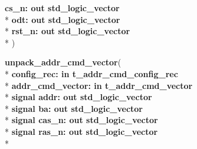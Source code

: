 \begin{DoxyCompactItemize}
  {\bfseries \textcolor{vhdlchar}{ }\textcolor{vhdlchar}{cs\+\_\+n\+: }\textcolor{stringliteral}{} {\bfseries \textcolor{keywordflow}{out}\textcolor{vhdlchar}{ }\textcolor{comment}{std\+\_\+logic\+\_\+vector}\textcolor{vhdlchar}{ }}}\\*
  {\bfseries \textcolor{vhdlchar}{ }\textcolor{vhdlchar}{odt\+: }\textcolor{stringliteral}{} {\bfseries \textcolor{keywordflow}{out}\textcolor{vhdlchar}{ }\textcolor{comment}{std\+\_\+logic\+\_\+vector}\textcolor{vhdlchar}{ }}}\\*
  {\bfseries \textcolor{vhdlchar}{ }\textcolor{vhdlchar}{rst\+\_\+n\+: }\textcolor{stringliteral}{} {\bfseries \textcolor{keywordflow}{out}\textcolor{vhdlchar}{ }\textcolor{comment}{std\+\_\+logic\+\_\+vector}\textcolor{vhdlchar}{ }}}\\*
   )
\item 
{\bfseries {\bfseries \textcolor{vhdlchar}{ }}} {\bf unpack\+\_\+addr\+\_\+cmd\+\_\+vector}( \\*
{\bfseries \textcolor{vhdlchar}{ }\textcolor{vhdlchar}{config\+\_\+rec\+: }\textcolor{stringliteral}{} {\bfseries \textcolor{keywordflow}{in}\textcolor{vhdlchar}{ }\textcolor{vhdlchar}{t\+\_\+addr\+\_\+cmd\+\_\+config\+\_\+rec}\textcolor{vhdlchar}{ }}}\\*
  {\bfseries \textcolor{vhdlchar}{ }\textcolor{vhdlchar}{addr\+\_\+cmd\+\_\+vector\+: }\textcolor{stringliteral}{} {\bfseries \textcolor{keywordflow}{in}\textcolor{vhdlchar}{ }\textcolor{vhdlchar}{t\+\_\+addr\+\_\+cmd\+\_\+vector}\textcolor{vhdlchar}{ }}}\\*
  {\bfseries \textcolor{keywordflow}{signal }\textcolor{vhdlchar}{addr\+: }\textcolor{stringliteral}{} {\bfseries \textcolor{keywordflow}{out}\textcolor{vhdlchar}{ }\textcolor{comment}{std\+\_\+logic\+\_\+vector}\textcolor{vhdlchar}{ }}}\\*
  {\bfseries \textcolor{keywordflow}{signal }\textcolor{vhdlchar}{ba\+: }\textcolor{stringliteral}{} {\bfseries \textcolor{keywordflow}{out}\textcolor{vhdlchar}{ }\textcolor{comment}{std\+\_\+logic\+\_\+vector}\textcolor{vhdlchar}{ }}}\\*
  {\bfseries \textcolor{keywordflow}{signal }\textcolor{vhdlchar}{cas\+\_\+n\+: }\textcolor{stringliteral}{} {\bfseries \textcolor{keywordflow}{out}\textcolor{vhdlchar}{ }\textcolor{comment}{std\+\_\+logic\+\_\+vector}\textcolor{vhdlchar}{ }}}\\*
  {\bfseries \textcolor{keywordflow}{signal }\textcolor{vhdlchar}{ras\+\_\+n\+: }\textcolor{stringliteral}{} {\bfseries \textcolor{keywordflow}{out}\textcolor{vhdlchar}{ }\textcolor{comment}{std\+\_\+logic\+\_\+vector}\textcolor{vhdlchar}{ }}}\\*

\end{DoxyCompactItemize}
